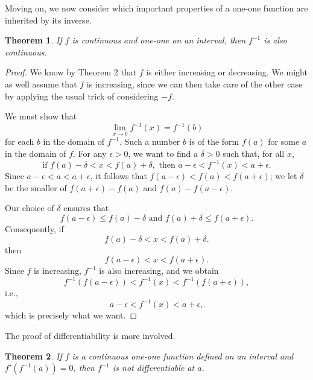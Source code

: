 \documentclass{article}
\newtheorem{theorem}{Theorem}
\begin{document}
Moving on, we now consider which important properties of a one-one function are
inherited by its inverse.

\begin{theorem}
  If $f$ is continuous and one-one on an interval, then $f^{-1}$ is also
  continuous.
\end{theorem}
\begin{proof}
  We know by Theorem 2 that $f$ is either increasing or decreasing. We might as
  well assume that $f$ is increasing, since we can then take care of the other
  case by applying the usual trick of considering $-f$.

  We must show that \[
    \lim_{x \to b} f^{-1}(x) = f^{-1}(b)
  \] for each $b$ in the domain of $f^{-1}$. Such a number $b$ is of the form
  $f(a)$ for some $a$ in the domain of $f$. For any $\epsilon > 0$, we want to
  find a $\delta > 0$ such that, for all $x$, \[
    \text{if } f(a) - \delta < x < f(a) + \delta,
    \text{ then } a - \epsilon < f^{-1}(x) < a + \epsilon.
  \] Since $a - \epsilon < a < a + \epsilon$, it follows that $f(a - \epsilon)
  < f(a) < f(a + \epsilon)$; we let $\delta$ be the smaller of $f(a + \epsilon)
  - f(a)$ and $f(a) - f(a - \epsilon)$.

  Our choice of $\delta$ ensures that \[
    f(a - \epsilon)
    \leq f(a) - \delta \text{ and } f(a) + \delta \leq f(a + \epsilon).
  \] Consequently, if \[
    f(a) - \delta < x < f(a) + \delta.
  \] then \[
    f(a - \epsilon) < x < f(a + \epsilon).
    \] Since $f$ is increasing, $f^{-1}$ is also increasing, and we obtain \[
    f^{-1}(f(a - \epsilon)) < f^{-1}(x) < f^{-1}(f(a + \epsilon)),
  \] i.e., \[
    a - \epsilon < f^{-1}(x) < a + \epsilon,
  \] which is precisely what we want.
\end{proof}

The proof of differentiability is more involved.

\begin{theorem}
  If $f$ is a continuous one-one function defined on an interval and
  $f'(f^{-1}(a)) = 0$, then $f^{-1}$ is \emph{not} differentiable at $a$.
\end{theorem}
\end{document}
